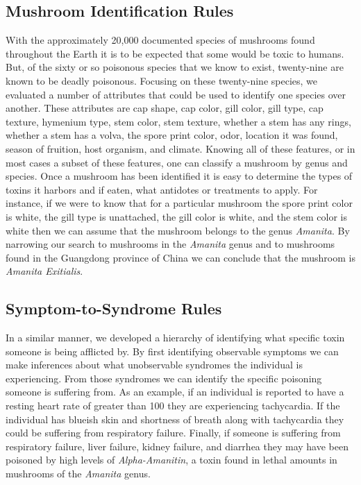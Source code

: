 \documentclass[12pt, conference, compsocconf]{IEEEtran}
\begin{document}
\subsection{Mushroom Identification Rules}
With the approximately 20,000 documented species of mushrooms found throughout the Earth it is to be expected that some would be toxic to humans. But, of the sixty or so poisonous species that we know to exist, twenty-nine are known to be deadly poisonous. 
Focusing on these twenty-nine species, we evaluated a number of attributes that could be used to identify one species over another. These attributes are cap shape, cap color, gill color, gill type, cap texture, hymenium type, stem color, stem texture, whether a stem has any rings, whether a stem has a volva, the spore print color, odor, location it was found, season of fruition, host organism, and climate. 
Knowing all of these features, or in most cases a subset of these features, one can classify a mushroom by genus and species. Once a mushroom has been identified it is easy to determine the types of toxins it harbors and if eaten, what antidotes or treatments to apply. 
For instance, if we were to know that for a particular mushroom the spore print color is white, the gill type is unattached, the gill color is white, and the stem color is white then we can assume that the mushroom belongs to the genus \emph{Amanita}. 
By narrowing our search to mushrooms in the \emph{Amanita} genus and to mushrooms found in the Guangdong province of China we can conclude that the mushroom is \emph{Amanita Exitialis}.

\subsection{Symptom-to-Syndrome Rules}
In a similar manner, we developed a hierarchy of identifying what specific toxin someone is being afflicted by. 
By first identifying observable symptoms we can make inferences about what unobservable syndromes the individual is experiencing. From those syndromes we can identify the specific poisoning someone is suffering from.
As an example, if an individual is reported to have a resting heart rate of greater than 100 they are experiencing tachycardia. If the individual has blueish skin and shortness of breath along with tachycardia they could be suffering from respiratory failure. 
Finally, if someone is suffering from respiratory failure, liver failure, kidney failure, and diarrhea they may have been poisoned by high levels of \emph{Alpha-Amanitin}, a toxin found in lethal amounts in mushrooms of the \emph{Amanita} genus.
\end{document}
